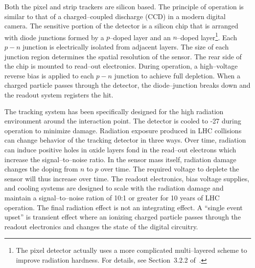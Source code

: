 Both the pixel and strip trackers are silicon based.  The principle of operation
is similar to that of a charged--coupled discharge (CCD) 
in a modern digital camera.  The sensitive portion of the detector is a silicon
chip that is arranged with diode junctions formed by a $p$--doped layer and an
$n$--doped layer\footnote{The pixel detector actually uses a more complicated
multi--layered scheme to improve radiation hardness.  For details, see
Section~3.2.2 of~\cite{CMSExperiment}.}.  Each $p-n$ junction is electrically
isolated from adjacent layers. The size of each junction region determines the
spatial resolution of the sensor.  The rear side of the chip is mounted to read--out
electronics.  During operation, a high--voltage reverse bias is applied to each
$p-n$ junction to achieve full depletion.  When a charged particle passes
through the detector, the diode--junction breaks down and the readout system
registers the hit.

The tracking system has been specifically designed for the high radiation
environment around the interaction point.  The detector is cooled to -27\celsius
during operation to minimize damage. Radiation exposure produced in LHC
collisions can change behavior of the tracking detector in three ways.  Over
time, radiation can induce positive holes in oxide layers fond in the read--out
electrons which increase the signal--to--noise ratio.  In the sensor mass
itself, radiation damage changes the doping from $n$ to $p$ over time.  The
required voltage to deplete the sensor will thus increase over time.  The
readout electronics, bias voltage supplies, and cooling systems are designed to
scale with the radiation damage and maintain a signal--to--noise ration of 10:1
or greater for 10 years of LHC operation.  The final radiation effect is not an
integrating effect.  A ``single event upset'' is transient effect where an
ionizing charged particle passes through the readout electronics and changes the
state of the digital circuitry.  

